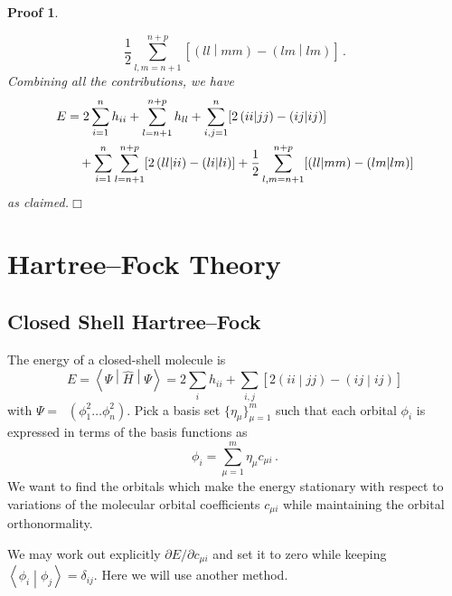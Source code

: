 \documentclass{article}
\theoremstyle{plain}\theoremheaderfont{\normalfont\itshape}\theorembodyfont{\rmfamily}\theoremseparator{.}\newtheorem*{rem}{Remark}\newtheorem*{ex}{Example}\newtheorem*{proof}{Proof}\newtheorem*{altp}{Alternative proof}
\theoremstyle{plain}\theoremheaderfont{\normalfont\bfseries}\theorembodyfont{\rmfamily}\theoremseparator{.}\newtheorem{thm}{Theorem}[section]\newtheorem{lem}[thm]{Lemma}\newtheorem{prop}[thm]{Proposition}\newtheorem*{cor}{Corollary}\newtheorem{defn}[thm]{Definition}\newtheorem{clm}[thm]{Claim}\newtheorem{clminproof}{Claim}
\theoremstyle{break}\theoremheaderfont{\normalfont\itshape}\theorembodyfont{\rmfamily}\theoremseparator{.\medskip}\newtheorem*{proofskip}{Proof}\newtheorem*{exs}{Examples}\newtheorem*{rems}{Remarks}
\theoremstyle{break}\theoremheaderfont{\normalfont\bfseries}\theorembodyfont{\rmfamily}\theoremseparator{.\medskip}\newtheorem{lemskip}[thm]{Lemma}\newtheorem{defnskip}[thm]{Definition}\newtheorem{propskip}[thm]{Proposition}\newtheorem{thmskip}[thm]{Theorem}
\numberwithin{equation}{section}
\newcommand{\qed}{\hfill\ensuremath{\Box}}
\newcommand{\braket}[2]{\left\langle #1 \middle| #2 \right\rangle}
\newcommand{\expval}[2]{\left\langle #2 \middle| #1 \middle| #2 \right\rangle}
\newcommand{\bracket}[2]{\left( #1 \middle| #2 \right)}
\DeclareMathOperator{\antisymm}{\hat{\mathcal{A}}}
\begin{document}
\begin{proofskip}
\begin{enumerate}[topsep=0pt,label=(\roman*)]
            \begin{equation}
                \frac{1}{2}\sum_{l,m=n+1}^{n+p}[\bracket{ll}{mm}-\bracket{lm}{lm}]\,.
            \end{equation}
            Combining all the contributions, we have
            \begin{align}
                E&=2\sum_{i=1}^{n}h_{ii}+\sum_{l=n+1}^{n+p}h_{ll}+\sum_{i,j=1}^{n}[2\bracket{ii}{jj}-\bracket{ij}{ij}] \notag\\
                &\quad+\sum_{i=1}^{n}\sum_{l=n+1}^{n+p}[2\bracket{ll}{ii}-\bracket{li}{li}]+\frac{1}{2}\sum_{l,m=n+1}^{n+p}[\bracket{ll}{mm}-\bracket{lm}{lm}]
            \end{align}
            as claimed.\qed
        \end{enumerate}
    \end{proofskip}

    \newpage
    \section{Hartree--Fock Theory}
    \subsection{Closed Shell Hartree--Fock}
    The energy of a closed-shell molecule is
    \begin{equation}\label{closed_shell_SCF_energy}
        E=\expval{\hat{H}}{\Psi}=2\sum_{i}h_{ii}+\sum_{i,j}[2\bracket{ii}{jj}-\bracket{ij}{ij}]
    \end{equation}
    with \(\Psi=\antisymm(\phi_1^2\dots\phi_n^2)\). Pick a basis set \(\{\eta_\mu\}_{\mu=1}^{m}\) such that each orbital \(\phi_i\) is expressed in terms of the basis functions as
    \begin{equation}
        \phi_i=\sum_{\mu=1}^{m}\eta_\mu c_{\mu i}\,.
    \end{equation}
    We want to find the orbitals which make the energy stationary with respect to variations of the molecular orbital coefficients \(c_{\mu i}\) while maintaining the orbital orthonormality.

    We may work out explicitly \(\partial E/\partial c_{\mu i}\) and set it to zero while keeping \(\braket{\phi_i}{\phi_j}=\delta_{ij}\). Here we will use another method. 
    
\end{document}
